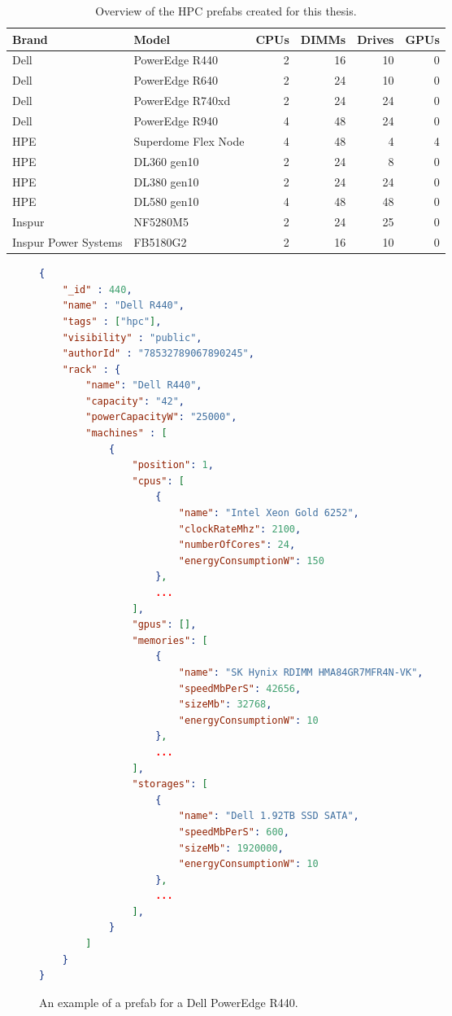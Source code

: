 \documentclass[11pt]{article}
\begin{document}
			\begin{table}[]
			\centering
				\begin{tabular}{llrrrr}
					\toprule
					Brand       & Model        & CPUs & DIMMs & Drives & GPUs \\ \midrule
					Dell                 & PowerEdge R440      & 2             & 16             & 10              & 0             \\
					Dell                 & PowerEdge R640      & 2             & 24             & 10              & 0             \\
					Dell                 & PowerEdge R740xd    & 2             & 24             & 24              & 0             \\
					Dell                 & PowerEdge R940      & 4             & 48             & 24              & 0             \\
					HPE                  & Superdome Flex Node & 4             & 48             & 4               & 4             \\
					HPE                  & DL360 gen10         & 2             & 24             & 8               & 0             \\
					HPE                  & DL380 gen10         & 2             & 24             & 24              & 0             \\
					HPE                  & DL580 gen10         & 4             & 48             & 48              & 0             \\
					Inspur               & NF5280M5            & 2             & 24             & 25              & 0             \\
					Inspur Power Systems & FB5180G2            & 2             & 16             & 10              & 0             \\ \bottomrule
				\end{tabular}
			\caption[Overview of the HPC prefabs created for this thesis]{Overview of the HPC prefabs created for this thesis.}
			\label{tab:2}
			\end{table}
			\newpage
			\begin{figure}[]
			\centering
				\begin{lstlisting}[language=json]
{
	"_id" : 440,
	"name" : "Dell R440",
	"tags" : ["hpc"],
	"visibility" : "public",
	"authorId" : "78532789067890245",
	"rack" : {
		"name": "Dell R440",
		"capacity": "42",
		"powerCapacityW": "25000",
		"machines" : [
			{
				"position": 1,
				"cpus": [
					{
						"name": "Intel Xeon Gold 6252",
						"clockRateMhz": 2100,
						"numberOfCores": 24,
						"energyConsumptionW": 150
					},
					...
				],
				"gpus": [],
				"memories": [
					{
						"name": "SK Hynix RDIMM HMA84GR7MFR4N-VK",
						"speedMbPerS": 42656,
						"sizeMb": 32768,
						"energyConsumptionW": 10
					},
					...
				],
				"storages": [
					{
						"name": "Dell 1.92TB SSD SATA",
						"speedMbPerS": 600,
						"sizeMb": 1920000,
						"energyConsumptionW": 10
					},
					...
				],
			}
		]
	}
}			\end{lstlisting}
				\caption[An example of a topology module for a Dell PowerEdge R440]{An example of a prefab for a Dell PowerEdge R440.}
				\label{fig:3}
			\end{figure}
\end{document}
